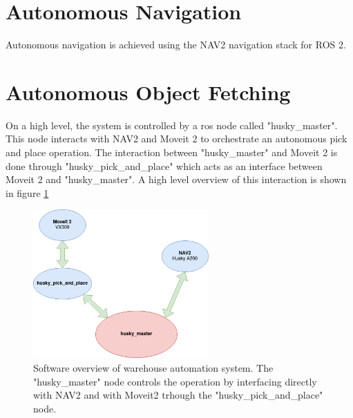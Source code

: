 \section{Autonomous Navigation}
Autonomous navigation is achieved using the NAV2 navigation stack for ROS 2.

\section{Autonomous Object Fetching}
On a high level, the system is controlled by a ros node called "husky\_master". This node interacts with NAV2 and Moveit 2 to orchestrate an autonomous pick and place operation. The interaction between "husky\_master" and Moveit 2 is done through "husky\_pick\_and\_place" which acts as an interface between Moveit 2 and "husky\_master". A high level overview of this interaction is shown in figure \ref{fig:software_overview}

\begin{figure}[H]
  \centering
  \includegraphics[width = 0.6\textwidth]{Figures/software_overview.drawio.png}
  \caption{Software overview of warehouse automation system. The "husky\_master" node controls the operation by interfacing directly with NAV2 and with Moveit2 trhough the "husky\_pick\_and\_place" node.}
  \label{fig:software_overview}
\end{figure}